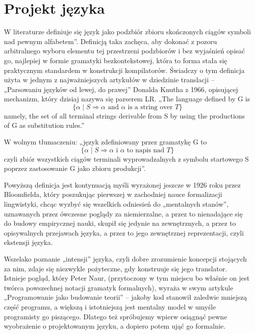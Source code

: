 \chapter{Projekt języka}
\label{cha:wywodJezyka}
W literaturze definiuje się język jako podzbiór zbioru skończonych ciągów symboli nad pewnym alfabetem”\cite{hopcroft_automaty}. Definicją taka zachęca, aby dokonać z pozoru arbitralnego wyboru elementu tej przestrzeni podzbiorów i bez wyjaśnień opisać go, najlepiej w formie gramatyki bezkontekstowej, która to forma stała się praktycznym standardem w konstrukcji kompilatorów. Świadczy o tym definicja użyta w jednym z najważniejszych artykułów w dziedzinie translacji – „Parsowaniu języków od lewej, do prawej” Donalda Knutha z 1966\cite{TRANSLATION_FROM_LEFT_TO_RIGHT}, opisującej mechanizm, który dzisiaj nazywa się parserem LR. 
„The language defined by G is
\[
\{ \alpha \mid S \Rightarrow \alpha \text{ and } \alpha \text{ is a string over } T \}
\]
namely, the set of all terminal strings derivable from S by using the productions of G as substitution rules.”

W wolnym tłumaczeniu:
„język zdefiniowany przez gramatykę G to \[
\{ \alpha \mid S \Rightarrow \alpha \text{ i } \alpha \text{ to napis nad } T \}
\]czyli zbiór wszystkich ciągów terminali wyprowadzalnych z symbolu startowego S poprzez zastosowanie G jako zbioru produkcji”.

Powyższą definicja jest kontynuacją myśli wyrażonej jeszcze w 1926 roku przez Bloomfielda\cite{BLOOMFIELD_1926}, który poszukując pierwszej w zachodniej nauce formalizacji lingwistyki, chcąc wyzbyć się wszelkich odniesień do „mentalnych stanów”, uznawanych przez ówczesne poglądy za niemierzalne, a przez to nienadające się do budowy empirycznej nauki, skupił się jedynie na zewnętrznych, a przez to opisywalnych przejawach języka, a przez to jego zewnętrznej reprezentacji,  czyli ekstensji języka.\cite{parsing_timeline_kegler}

Wszelako poznanie „intensji” języka, czyli dobre zrozumienie koncepcji stojących za nim, zdaje się niezwykle pożyteczne, gdy konstruuje się jego translator. Istnieje pogląd, który Peter Naur, (przytoczony w tym miejscu bo właśnie on jest twórca powszechnej notacji gramatyk formalnych), wyraża w swym artykule „Programowanie jako budowanie teorii” – jakoby kod stanowił zaledwie mniejszą część programu, a większą i istotniejszą jest mentalny model w umyśle programisty go piszącego\cite{NAUR_1985}. Dlatego też spróbujemy wpierw osiągnąć pewne wyobrażenie o projektowanym języku, a dopiero potem ująć go formalnie. 

